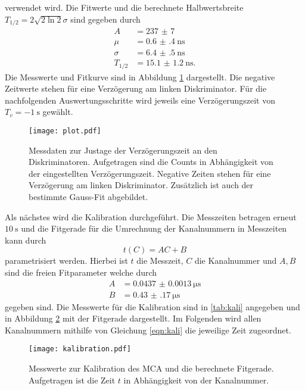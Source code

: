 verwendet wird. Die Fitwerte und die berechnete Halbwertsbreite $T_{1/2} =2\sqrt{2\ln2}\sigma$ sind gegeben durch 
\begin{align*}
    A &= \num{237(7)} \\
    \mu &= \SI{0.6(4)}{\nano\second} \\
    \sigma &= \SI{6.4(5)}{\nano\second} \\
    T_{1/2} &= \SI{15.1(12)}{\nano\second}.
\end{align*}
Die Messwerte und Fitkurve sind in Abbildung \ref{fig:Verzögerung} dargestellt. Die negative Zeitwerte stehen für eine Verzögerung am linken Diskriminator. 
Für die nachfolgenden Auswertungsschritte wird jeweils eine Verzögerungszeit von $T_v = \SI{-1}{\second}$ gewählt.
\begin{figure}
    \centering
    \texttt{[image: plot.pdf]}
    \caption{Messdaten zur Justage der Verzögerungszeit an den Diskriminatoren. Aufgetragen sind die Counts in Abhängigkeit von der eingestellten Verzögerungszeit. Negative Zeiten stehen für eine Verzögerung am linken Diskriminator. Zusätzlich ist auch der bestimmte Gauss-Fit abgebildet.}
    \label{fig:Verzögerung}
\end{figure} 
Als nächstes wird die Kalibration durchgeführt. Die Messzeiten betragen erneut $\SI{10}{\second}$ und die Fitgerade für die Umrechnung der Kanalnummern in Messzeiten kann durch 
\begin{equation}
    \label{eqn:kali}
    t(C) = AC + B
\end{equation}
parametrisiert werden. Hierbei ist $t$ die Messzeit, $C$ die Kanalnummer und $A,B$ sind die freien Fitparameter welche durch
\begin{align*}
    A &= \SI{0.0437(13)}{\micro\second} \\
    B &= \SI{0.43(17)}{\micro\second}
\end{align*}
gegeben sind. Die Messwerte für die Kalibration sind in \ref{tab:kali} angegeben und in Abbildung \ref{fig:kali} mit der Fitgerade dargestellt.
Im Folgenden wird allen Kanalnummern mithilfe von Gleichung \ref{eqn:kali} die jeweilige Zeit zugeordnet.
\begin{figure}
    \centering
    \texttt{[image: kalibration.pdf]}
    \caption{Messwerte zur Kalibration des MCA und die berechnete Fitgerade. Aufgetragen ist die Zeit $t$ in Abhängigkeit von der Kanalnummer.}
    \label{fig:kali}
\end{figure}
